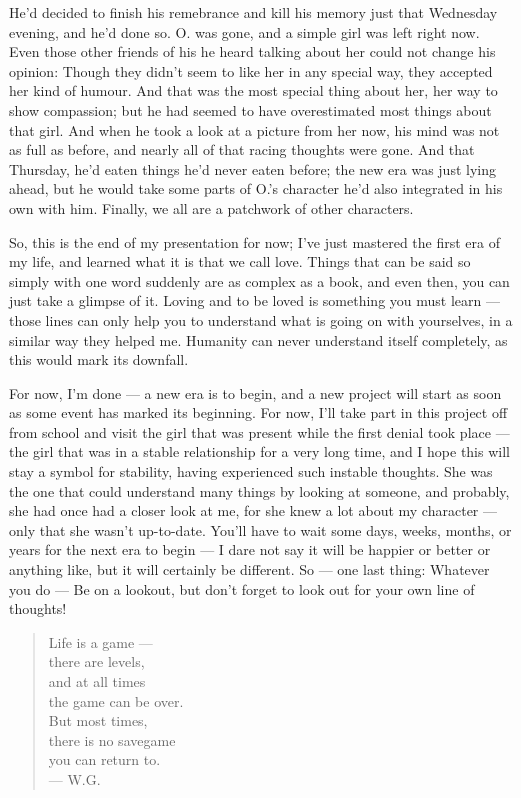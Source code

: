 He'd decided to finish his remebrance and kill his memory just that Wednesday evening, and he'd done so. O. was gone, and a simple girl was left right now.
Even those other friends of his he heard talking about her could not change his opinion: Though they didn't seem to like her in any special way, they accepted her kind of humour. 
And that was the most special thing about her, her way to show compassion; but he had seemed to have overestimated most things about that girl. And when he took a look at a picture from her now, his mind was not as full as before, and nearly all of that racing thoughts were gone. And that Thursday, he'd eaten things he'd never eaten before; the new era was just lying ahead, but he would take some parts of O.'s character he'd also integrated in his own with him. Finally, we all are a patchwork of other characters.

So, this is the end of my presentation for now; I've just mastered the first era of my life, and learned what it is that we call love. Things that can be said so simply with one word suddenly are as complex as a book, and even then, you can just take a glimpse of it. Loving and to be loved is something you must learn --- those lines can only help you to understand what is going on with yourselves, in a similar way they helped me. Humanity can never understand itself completely, as this would mark its downfall.

For now, I'm done --- a new era is to begin, and a new project will start as soon as some event has marked its beginning. For now, I'll take part in this project off from school and visit the girl that was present while the first denial took place --- the girl that was in a stable relationship for a very long time, and I hope this will stay a symbol for stability, having experienced such instable thoughts. She was the one that could understand many things by looking at someone, and probably, she had once had a closer look at me, for she knew a lot about my character --- only that she wasn't up-to-date. 
You'll have to wait some days, weeks, months, or years for the next era to begin --- I dare not say it will be happier or better or anything like, but it will certainly be different. 
So --- one last thing: Whatever you do --- Be on a lookout, but don't forget to look out for your own line of thoughts! 

\begin{verse}
Life is a game --- \\
there are levels, \\
and at all times \\
the game can be over. \\
But most times, \\
there is no savegame \\
you can return to. \\
--- W.G.
\end{verse}

